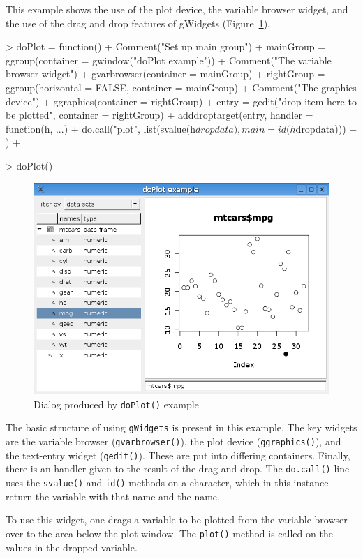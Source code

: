 \documentclass[12pt]{article}
\newcommand{\RCode}[1]{\texttt{#1}}
\newcommand{\RFunc}[1]{\texttt{#1()}}
\begin{document}
This example shows the use of the plot device, the variable browser
widget, and the use of the drag and
drop features of gWidgets (Figure~\ref{fig:doPlot}).



\begin{Schunk}
\begin{Sinput}
> doPlot = function() {
+     Comment("Set up main group")
+     mainGroup = ggroup(container = gwindow("doPlot example"))
+     Comment("The variable browser widget")
+     gvarbrowser(container = mainGroup)
+     rightGroup = ggroup(horizontal = FALSE, container = mainGroup)
+     Comment("The graphics device")
+     ggraphics(container = rightGroup)
+     entry = gedit("drop item here to be plotted", container = rightGroup)
+     adddroptarget(entry, handler = function(h, ...) {
+         do.call("plot", list(svalue(h$dropdata), main = id(h$dropdata)))
+     })
+ }
\end{Sinput}
\end{Schunk}
\begin{Soutput}
> doPlot()
\end{Soutput}


\begin{figure}[htbp]
  \centering
  \includegraphics[width=.6\textwidth]{doPlot}
  \caption{Dialog produced by \RFunc{doPlot} example}
  \label{fig:doPlot}
\end{figure}

The basic structure of using \RCode{gWidgets} is present in this
example. The key widgets are the variable browser
(\RFunc{gvarbrowser}), the plot device (\RFunc{ggraphics}), and the
text-entry widget (\RFunc{gedit}). These are put into differing
containers.  Finally, there is an handler given to the result of the
drag and drop. The \RFunc{do.call} line uses the \RFunc{svalue} and
\RFunc{id} methods on a character, which in this instance return the
variable with that name and the name.


To use this widget, one drags a variable to be plotted from the
variable browser over to the area below the plot window. The
\RFunc{plot} method is called on the values in the dropped variable.
\end{document}
